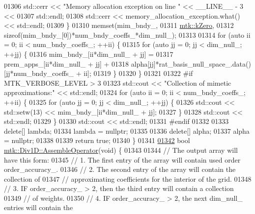 \begin{DoxyCode}
{{01306     std::cerr << \textcolor{stringliteral}{"Memory allocation exception on line "} << \_\_LINE\_\_ - 3 <<
01307       std::endl;
01308     std::cerr << memory\_allocation\_exception.what() << std::endl;
01309   \}
01310   memset(mim\_bndy\_,
01311          \hyperlink{group__c01-roots_ga59a451a5fae30d59649bcda274fea271}{mtk::kZero},
01312          \textcolor{keyword}{sizeof}(mim\_bndy\_[0])*num\_bndy\_coeffs\_*dim\_null\_);
01313 
01314   \textcolor{keywordflow}{for} (\textcolor{keyword}{auto} ii = 0; ii < num\_bndy\_coeffs\_; ++ii) \{
01315     \textcolor{keywordflow}{for} (\textcolor{keyword}{auto} jj = 0; jj < dim\_null\_; ++jj) \{
01316       mim\_bndy\_[ii*dim\_null\_ + jj] =
01317         prem\_apps\_[ii*dim\_null\_ + jj] +
01318         alpha[jj]*rat\_basis\_null\_space\_.data()[jj*num\_bndy\_coeffs\_ + ii];
01319     \}
01320   \}
01321 
01322 \textcolor{preprocessor}{  #if MTK\_VERBOSE\_LEVEL > 3}
01323   std::cout << \textcolor{stringliteral}{"Collection of mimetic approximations:"} << std::endl;
01324   \textcolor{keywordflow}{for} (\textcolor{keyword}{auto} ii = 0; ii < num\_bndy\_coeffs\_; ++ii) \{
01325     \textcolor{keywordflow}{for} (\textcolor{keyword}{auto} jj = 0; jj < dim\_null\_; ++jj) \{
01326       std::cout << std::setw(13) << mim\_bndy\_[ii*dim\_null\_ + jj];
01327     \}
01328     std::cout << std::endl;
01329   \}
01330   std::cout << std::endl;
01331 \textcolor{preprocessor}{  #endif}
01332 
01333   \textcolor{keyword}{delete}[] lambda;
01334   lambda = \textcolor{keyword}{nullptr};
01335 
01336   \textcolor{keyword}{delete}[] alpha;
01337   alpha = \textcolor{keyword}{nullptr};
01338 
01339   \textcolor{keywordflow}{return} \textcolor{keyword}{true};
01340 \}
01341 
\hypertarget{mtk__div__1d_8cc_source_l01342}{}\hyperlink{classmtk_1_1Div1D_a5a12482e1ceac232339dd8f647af886b}{01342} \textcolor{keywordtype}{bool} \hyperlink{classmtk_1_1Div1D_a5a12482e1ceac232339dd8f647af886b}{mtk::Div1D::AssembleOperator}(\textcolor{keywordtype}{void}) \{
01343 
01344   \textcolor{comment}{// The output array will have this form:}
01345   \textcolor{comment}{// 1. The first entry of the array will contain used order order\_accuracy\_.}
01346   \textcolor{comment}{// 2. The second entry of the array will contain the collection of}
01347   \textcolor{comment}{// approximating coefficients for the interior of the grid.}
01348   \textcolor{comment}{// 3. IF order\_accuracy\_ > 2, then the third entry will contain a collection}
01349   \textcolor{comment}{// of weights.}
01350   \textcolor{comment}{// 4. IF order\_accuracy\_ > 2, the next dim\_null\_ entries will contain the}
}}
\end{DoxyCode}
